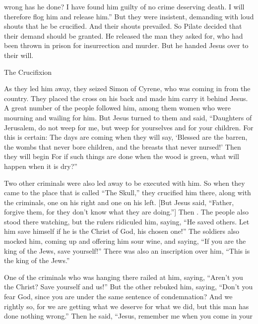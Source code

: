 {wrong
has he done? I have found
him
guilty
of no
crime deserving death.
I will
therefore
flog
him
and release him.”
But
they were insistent,
demanding
with loud
shouts
that he
be crucified.
And
their
shouts
prevailed.
So
Pilate
decided
that their
demand
should be granted.
He released
the man
they asked
for, who had been thrown
in
prison
for
insurrection
and
murder.
But
he handed
Jesus
over
to their
will.
\par }{\SH The Crucifixion
\par }{\PP {}As
they led
him
away,
they seized
Simon
of Cyrene,
who was coming in
from
the country.
They placed
the cross
on his back
and made him carry
it behind
Jesus.
A
great
number
of the people
followed
him,
among them women
who were mourning
and
wailing
for him.
But
Jesus
turned
to
them
and said,
“Daughters
of Jerusalem,
do not
weep
for
me,
but
weep
for
yourselves
and
for
your
children.
For
this is certain: The days
are coming
when they will say,
‘Blessed
are the barren,
the wombs
that
never
bore children,
and
the breasts
that
never
nursed!’
Then
they will begin
{}
For
if
such things
are done
when the wood
is green,
what
will happen
when it is dry?”
\par }{\PP {}Two
other
criminals
were
also
led away
to be executed
with
him.
So
when
they came
to
the place
that is called
“The Skull,”
they crucified
him
there,
along with the criminals,
one
on
his right
and
one
on
his left.
[But
Jesus
said,
“Father,
forgive
them,
for
they
don’t
know
what
they are doing.”] Then
{}
{}.
The people
also stood
there watching,
but
the rulers
ridiculed
him, saying,
“He saved
others.
Let him save
himself
if
he
is
the Christ
of God,
his chosen one!”
The soldiers
also
mocked
him,
coming up
and offering
him
sour wine,
and
saying,
“If
you
are
the king
of the Jews,
save
yourself!”
There was
also
an inscription
over
him,
“This
is the king
of the Jews.”
\par }{\PP {}One
of the criminals
who was hanging
there railed at
him,
saying, “Aren’t
you
the Christ? Save
yourself
and
us!”
But
the other
rebuked
him,
saying, “Don’t
you
fear
God,
since
you are
under
the same sentence
of condemnation?
And
we
rightly
so,
for we are getting
what we deserve
for
what
we did,
but
this man
has done
nothing
wrong.”
Then
he said,
“Jesus,
remember
me
when
you come
in
your
}
